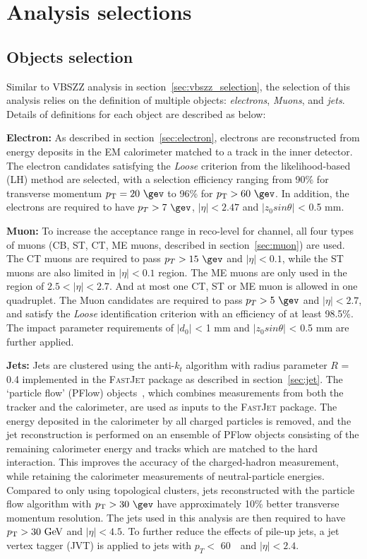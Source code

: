 \section{Analysis selections}
\label{sec:hmhzz_selection}

\subsection{Objects selection}
\label{sec:hmhzz_objsel}

Similar to VBSZZ analysis in section~\ref{sec:vbszz_selection}, the selection of this analysis relies on the definition of multiple objects: \textit{electrons}, \textit{Muons}, and \textit{jets}.
Details of definitions for each object are described as below:

\textbf{Electron:}
As described in section~\ref{sec:electron}, electrons are reconstructed from energy deposits in the EM calorimeter matched to a track in the inner detector.
The electron candidates satisfying the \textit{Loose} criterion from the likelihood-based (LH) method are selected,
with a selection efficiency ranging from 90\% for transverse momentum $\pt = 20~\gev$ to 96\% for $\pt > 60~\gev$.
In addition, the electrons are required to have $p_{T} > 7~\gev$, $|\eta| < 2.47$ and $|z_{0} sin\theta|$ < 0.5 mm.

\textbf{Muon:}
To increase the acceptance range in reco-level for \llll channel, all four types of muons
(CB, ST, CT, ME muons, described in section~\ref{sec:muon}) are used.
The CT muons are required to pass $p_{T} > 15~\gev$ and $|\eta| < 0.1$, while the ST muons are also limited in $|\eta| < 0.1$ region.
The ME muons are only used in the region of $2.5 < |\eta| < 2.7$.
And at most one CT, ST or ME muon is allowed in one \llll quadruplet.
The Muon candidates are required to pass $p_{T} > 5~\gev$ and $|\eta| < 2.7$,
and satisfy the \textit{Loose} identification criterion with an efficiency of at least 98.5\%.
The impact parameter requirements of $|d_{0}|$ < 1 mm and $|z_{0} sin\theta|$ < 0.5 mm are further applied.

\textbf{Jets:}
Jets are clustered using the anti-$k_t$ algorithm with radius parameter $R$ = 0.4 implemented in the \textsc{FastJet} package as described in section~\ref{sec:jet}. 
The `particle flow' (PFlow) objects~\cite{PERF-2015-09}, which combines measurements from both the tracker and the calorimeter, are used as inputs to the \textsc{FastJet} package.
The energy deposited in the calorimeter by all charged particles is removed, and the jet reconstruction is performed on an ensemble of PFlow objects
consisting of the remaining calorimeter energy and tracks which are matched to the hard interaction.
This improves the accuracy of the charged-hadron measurement, while retaining the calorimeter measurements of neutral-particle energies. 
Compared to only using topological clusters, jets reconstructed with the particle flow algorithm with $\pt > 30~\gev$ have approximately 10\% better transverse momentum resolution.
The jets used in this analysis are then required to have $p_{\text{T}} > 30~\text{Ge\kern -0.1em V}$ and $|\eta | < 4.5$.
To further reduce the effects of pile-up jets, a jet vertex tagger (JVT) is applied to jets with $p_{T} <$ 60~\gev~and $|\eta| < 2.4$.

